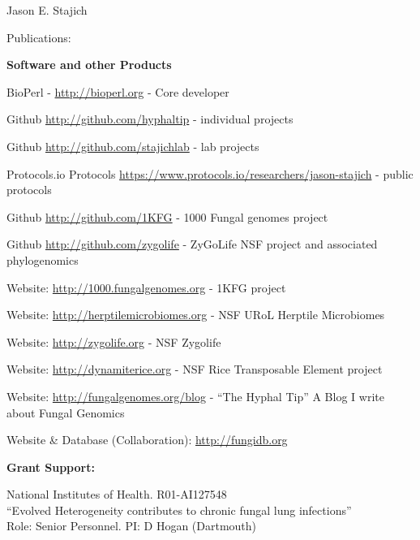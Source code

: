 \documentclass[10pt]{article}
\begin{document}
\begin{cv}{\centerline{Jason E. Stajich}}
\begin{cvlist}{Publications:}
\begin{cvlistcompact}{\bf Software and other Products}
  \item BioPerl - \url{http://bioperl.org} - Core developer
\item Github \url{http://github.com/hyphaltip} - individual
  projects
\item Github \url{http://github.com/stajichlab} - lab
  projects
 \item Protocols.io Protocols \url{https://www.protocols.io/researchers/jason-stajich} - public protocols
 \item Github \url{http://github.com/1KFG} - 1000 Fungal
   genomes project
\item Github \url{http://github.com/zygolife} - ZyGoLife NSF project
  and associated phylogenomics
\item Website: \url{http://1000.fungalgenomes.org} - 1KFG project
\item Website: \url{http://herptilemicrobiomes.org} - NSF URoL Herptile Microbiomes
\item Website: \url{http://zygolife.org} - NSF Zygolife
\item Website: \url{http://dynamiterice.org} - NSF Rice Transposable
    Element project
\item Website: \url{http://fungalgenomes.org/blog} - ``The Hyphal
  Tip'' A Blog I write about Fungal Genomics
\item Website \& Database (Collaboration): \url{http://fungidb.org}
\end{cvlistcompact}


\end{cvlist}
\setlength{\cvlabelwidth}{24mm}


\begin{cvlistcompact}{\bf Grant Support:}
\item [{\bf Ongoing support}]

\item [2017-2026] National Institutes of Health. R01-AI127548 \\
``Evolved Heterogeneity contributes to chronic fungal lung infections'' \\
Role: Senior Personnel. PI: D Hogan (Dartmouth)


\end{cvlistcompact}
\end{cv}
\end{document}
